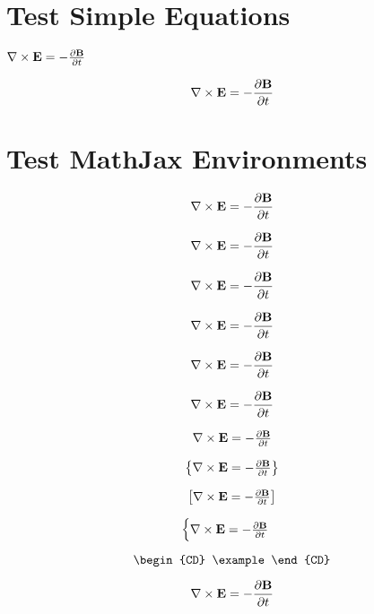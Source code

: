 \documentclass[]{article}
\date{}
\begin{document}
\(\newcommand\example{\nabla \times \mathbf{E} = - \frac{\partial \mathbf{B}}{\partial t}}\)

\section{Test Simple Equations}\label{test-simple-equations}

\(\example\)

\[\example\]

\section{Test MathJax Environments}\label{test-mathjax-environments}

\begin{align}
\example
\end{align}

\begin{align*}
\example
\end{align*}

\begin{alignat}{2}
\example
\end{alignat}

\begin{alignat*}{2}
\example
\end{alignat*}

\[\begin{aligned}
\example
\end{aligned}\]

\[\begin{alignedat}{2}
\example
\end{alignedat}\]

\[\begin{array}{lcl}
\example
\end{array}\]

\[\begin{Bmatrix}
\example
\end{Bmatrix}\]

\[\begin{bmatrix}
\example
\end{bmatrix}\]

\[\begin{cases}
\example
\end{cases}\]

\[\begin{CD}
\example
\end{CD}\]

\begin{eqnarray}
\example
\end{eqnarray}
\end{document}
